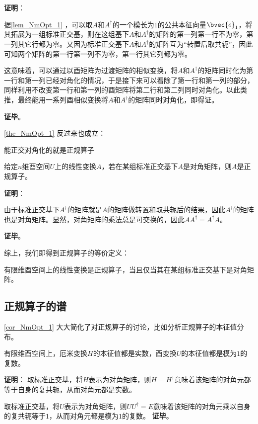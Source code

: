 \textbf{证明}：

据\autoref{lem_NmOpt_1} ，可以取$A$和$A^\dagger$的一个模长为$1$的公共本征向量$\bvec{e}_1$，将其拓展为一组标准正交基，则在这组基下$A$和$A^\dagger$的矩阵的第一列第一行不为零，第一列其它行都为零。又因为标准正交基下$A$和$A^\dagger$的矩阵互为“转置后取共轭”，因此可知两个矩阵的第一行第一列不为零，第一行其它列都为零。

这意味着，可以通过以酉矩阵为过渡矩阵的相似变换，将$A$和$A^\dagger$的矩阵同时化为第一行和第一列已经对角化的情况，于是接下来可以看除了第一行和第一列的部分，同样利用不改变第一行和第一列的酉矩阵将第二行和第二列同时对角化。以此类推，最终能用一系列酉相似变换将$A$和$A^\dagger$的矩阵同时对角化，即得证。

\textbf{证毕}。


\autoref{the_NmOpt_1} 反过来也成立：


\begin{theorem}{能正交对角化的就是正规算子}

给定$n$维酉空间$U$上的线性变换$A$，若在某组标准正交基下$A$是对角矩阵，则$A$是正规算子。

\end{theorem}

\textbf{证明}：

由于标准正交基下$A^\dagger$的矩阵就是$A$的矩阵做转置和取共轭后的结果，因此$A^\dagger$的矩阵也是对角矩阵。显然，对角矩阵的乘法总是可交换的，因此$AA^\dagger = A^\dagger A$。

\textbf{证毕}。


综上，我们即得到正规算子的等价定义：


\begin{corollary}{}
有限维酉空间上的线性变换是正规算子，当且仅当其在某组标准正交基下是对角矩阵。
\end{corollary}

\subsection{正规算子的谱}
\autoref{cor_NmOpt_1} 大大简化了对正规算子的讨论，比如分析正规算子的本征值分布。

\begin{theorem}{}
有限维酉空间上，厄米变换$H$的本征值都是实数，酉变换$U$的本征值都是模为$1$的复数。
\end{theorem}

\textbf{证明}：
取标准正交基，将$H$表示为对角矩阵，则$H=H^\dagger$意味着该矩阵的对角元都等于自身的复共轭，从而对角元都是实数。

取标准正交基，将$U$表示为对角矩阵，则$UU^\dagger = E$意味着该矩阵的对角元乘以自身的复共轭等于$1$，从而对角元都是模为$1$的复数。
\textbf{证毕}。
